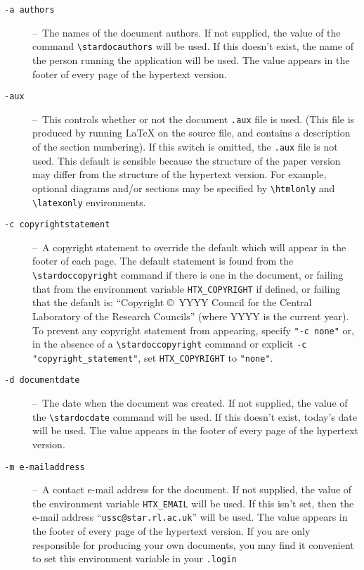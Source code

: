 \documentclass[twoside,11pt]{article}
\newcommand{\stardoccopyright} 
{Copyright \copyright\ 2000-2004 Council for the Central Laboratory of the Research Councils
<br>
Copyright \copyright\ 2008 Science and Technology Facilities Council}
\newcommand{\stardocauthors}   {P W Draper\\
                                A J Chipperfield\\
                                M D Lawden}
\newcommand{\stardocdate}      {15 January 2008}
\renewcommand{\_}{\texttt{\symbol{95}}}
\newcommand{\dash}{--}
\newcommand{\dash}{-}
\begin{document}
\begin{description}
\item[\texttt{-a authors}] \dash\
   The names of the document authors.
   If not supplied, the value of the command \verb#\stardocauthors# will be
   used.
   If this doesn't exist, the name of the person running the application will
   be used.
   The value appears in the footer of every page of the hypertext version.
\item[\texttt{-aux}] \dash\
   This controls whether or not the document \texttt{.aux} file is used.
   (This file is produced by running LaTeX on the source file, and contains a
   description of the section numbering).
   If this switch is omitted, the \texttt{.aux} file is not used.
   This default is sensible because the structure of the paper version
   may differ from the structure of the hypertext version.
   For example, optional diagrams and/or sections may be specified by
   \verb+\htmlonly+ and \verb+\latexonly+ environments.
\item[\texttt{-c copyright\_statement}] \dash\
   A copyright statement to override the default which will appear
   in the footer of each page. The default statement is found from
   the \verb#\stardoccopyright# command if there is one in the document, or 
   failing that from the environment variable \verb#HTX_COPYRIGHT# if defined,
   or failing that the default is: ``Copyright \copyright\ YYYY Council for
   the Central Laboratory of the Research Councils'' (where YYYY is the
   current year).
   To prevent any copyright statement from appearing, specify \verb#"-c none"#
   or, in the absence of a \verb#\stardoccopyright# command or explicit
   \verb#-c "copyright_statement"#, set  \verb#HTX_COPYRIGHT# to \verb#"none"#.
\item[\texttt{-d document\_date}] \dash\
   The date when the document was created.
   If not supplied, the value of the \verb#\stardocdate# command will be used.
   If this doesn't exist, today's date will be used.
   The value appears in the footer of every page of the hypertext version.
\item[\texttt{-m e-mail\_address}] \dash\
   A contact e-mail address for the document.
   If not supplied, the value of the environment variable
   \verb#HTX_EMAIL# will be used.
   If this isn't set, then the e-mail address
   ``\texttt{ussc@star.rl.ac.uk}'' will be used.
   The value appears in the footer of every page of the hypertext version.
   If you are only responsible for producing your own documents, you may find
   it convenient to set this environment variable in your \texttt{.login}

\end{description}
\end{document}
